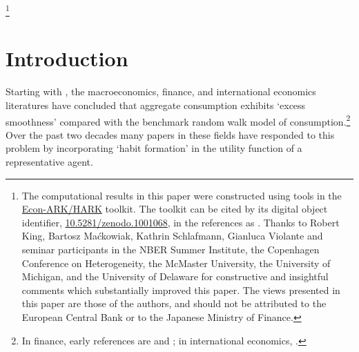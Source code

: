 \documentclass[titlepage]{\econtex}\newcommand{\texname}{cAndCwithStickyE}
\begin{document}
\begin{authorsinfo}
\end{authorsinfo}
\thanks{The computational results in this paper were constructed using tools in the \href{http://github.com/Econ-ARK/HARK}{Econ-ARK/HARK} toolkit.  The toolkit can be cited by its digital object identifier, \href{https://doi.org/10.5281/zenodo.1001068}{10.5281/zenodo.1001068}, in the references as \cite{matthew_n_white_2017_1001068}.  Thanks to Robert King, Bartosz Ma\'ckowiak, Kathrin Schlafmann, Gianluca Violante and seminar participants in the NBER Summer Institute, the Copenhagen Conference on Heterogeneity, the McMaster University, the University of Michigan, and the University of Delaware for constructive and insightful comments which substantially improved this paper. The views presented in this paper are those of the authors, and should not be attributed to the European Central Bank or to the Japanese Ministry of Finance.}

\titlepagefinish
\setcounter{page}{1}

\pagebreak


\section{Introduction}

Starting with \cite{cdSmooth}, the macroeconomics, finance, and international economics literatures have concluded that aggregate consumption exhibits `excess smoothness' compared with the benchmark \cite{hallRandomWalk} random walk model of consumption.\footnote{In finance, early references are \cite{abel:aerhabits} and \cite{constantinidesHabits}; in international economics, \cite{gru04}.}  Over the past two decades many papers in these fields have responded to this problem by incorporating `habit formation' in the utility function of a representative agent.
\end{document}
